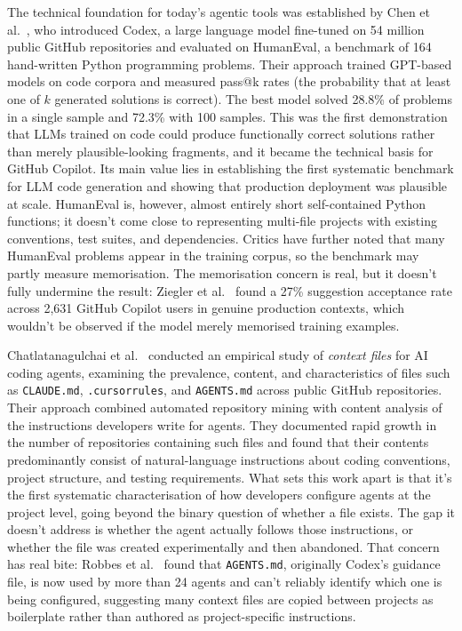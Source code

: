 The technical foundation for today's agentic tools was established by Chen et
al.~\cite{chen2021codex}, who introduced Codex, a large language model fine-tuned
on 54 million public GitHub repositories and evaluated on HumanEval, a benchmark
of 164 hand-written Python programming problems. Their approach trained GPT-based
models on code corpora and measured pass@k rates (the probability that at least one
of $k$ generated solutions is correct). The best model solved 28.8\% of problems
in a single sample and 72.3\% with 100 samples. This was the first demonstration
that LLMs trained on code could produce functionally correct solutions rather than
merely plausible-looking fragments, and it became the technical basis for GitHub
Copilot. Its main value lies in establishing the first systematic benchmark for
LLM code generation and showing that production deployment was plausible at scale.
HumanEval is, however, almost entirely short self-contained Python functions; it
doesn't come close to representing multi-file projects with existing conventions,
test suites, and dependencies. Critics have further noted that many HumanEval
problems appear in the training corpus, so the benchmark may partly measure
memorisation. The memorisation concern is real, but it doesn't fully undermine the
result: Ziegler et al.~\cite{ziegler2022} found a 27\% suggestion acceptance rate
across 2,631 GitHub Copilot users in genuine production contexts, which wouldn't be
observed if the model merely memorised training examples.

Chatlatanagulchai et al.~\cite{chatlatanagulchai2025} conducted an empirical study
of \emph{context files} for AI coding agents, examining the prevalence, content, and
characteristics of files such as \texttt{CLAUDE.md}, \texttt{.cursorrules}, and
\texttt{AGENTS.md} across public GitHub repositories. Their approach combined
automated repository mining with content analysis of the instructions developers
write for agents. They documented rapid growth in the number of repositories
containing such files and found that their contents predominantly consist of
natural-language instructions about coding conventions, project structure, and
testing requirements. What sets this work apart is that it's the first systematic
characterisation of how developers configure agents at the project level, going
beyond the binary question of whether a file exists. The gap it doesn't address is
whether the agent actually follows those instructions, or whether the file was
created experimentally and then abandoned. That concern has real bite: Robbes et
al.~\cite{robbesAgenticMuch2026} found that \texttt{AGENTS.md}, originally Codex's
guidance file, is now used by more than 24 agents and can't reliably identify which
one is being configured, suggesting many context files are copied between projects
as boilerplate rather than authored as project-specific instructions.

